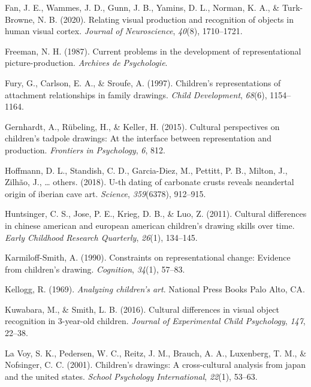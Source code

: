 \documentclass[
  english,
  man]{apa6}
\begin{document}
\leavevmode\hypertarget{ref-fan2020relating}{}%
Fan, J. E., Wammes, J. D., Gunn, J. B., Yamins, D. L., Norman, K. A., \& Turk-Browne, N. B. (2020). Relating visual production and recognition of objects in human visual cortex. \emph{Journal of Neuroscience}, \emph{40}(8), 1710--1721.

\leavevmode\hypertarget{ref-freeman1987current}{}%
Freeman, N. H. (1987). Current problems in the development of representational picture-production. \emph{Archives de Psychologie}.

\leavevmode\hypertarget{ref-fury1997children}{}%
Fury, G., Carlson, E. A., \& Sroufe, A. (1997). Children's representations of attachment relationships in family drawings. \emph{Child Development}, \emph{68}(6), 1154--1164.

\leavevmode\hypertarget{ref-gernhardt2015cultural}{}%
Gernhardt, A., Rübeling, H., \& Keller, H. (2015). Cultural perspectives on children's tadpole drawings: At the interface between representation and production. \emph{Frontiers in Psychology}, \emph{6}, 812.

\leavevmode\hypertarget{ref-hoffmann2018u}{}%
Hoffmann, D. L., Standish, C. D., Garcia-Diez, M., Pettitt, P. B., Milton, J., Zilhão, J., \ldots{} others. (2018). U-th dating of carbonate crusts reveals neandertal origin of iberian cave art. \emph{Science}, \emph{359}(6378), 912--915.

\leavevmode\hypertarget{ref-huntsinger2011cultural}{}%
Huntsinger, C. S., Jose, P. E., Krieg, D. B., \& Luo, Z. (2011). Cultural differences in chinese american and european american children's drawing skills over time. \emph{Early Childhood Research Quarterly}, \emph{26}(1), 134--145.

\leavevmode\hypertarget{ref-karmiloff1990constraints}{}%
Karmiloff-Smith, A. (1990). Constraints on representational change: Evidence from children's drawing. \emph{Cognition}, \emph{34}(1), 57--83.

\leavevmode\hypertarget{ref-kellogg1969analyzing}{}%
Kellogg, R. (1969). \emph{Analyzing children's art}. National Press Books Palo Alto, CA.

\leavevmode\hypertarget{ref-kuwabara2016cultural}{}%
Kuwabara, M., \& Smith, L. B. (2016). Cultural differences in visual object recognition in 3-year-old children. \emph{Journal of Experimental Child Psychology}, \emph{147}, 22--38.

\leavevmode\hypertarget{ref-la2001children}{}%
La Voy, S. K., Pedersen, W. C., Reitz, J. M., Brauch, A. A., Luxenberg, T. M., \& Nofsinger, C. C. (2001). Children's drawings: A cross-cultural analysis from japan and the united states. \emph{School Psychology International}, \emph{22}(1), 53--63.
\end{document}
